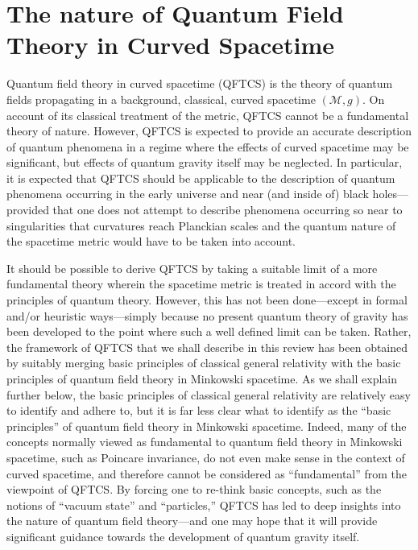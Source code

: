 \documentclass[12pt]{article}
\newcommand{\M}{\mathscr{M}}
\theoremstyle{plain}
\theoremstyle{definition}
\begin{document}

\newpage

\section{The nature of Quantum Field Theory in Curved Spacetime}

Quantum field theory in curved spacetime (QFTCS) is the theory of quantum fields propagating in a background,
classical, curved spacetime $(\M, g)$. On account of its classical treatment of the metric, QFTCS cannot be a fundamental theory of nature. However, QFTCS is expected to provide an accurate description of quantum phenomena in a regime where the effects of curved spacetime may be significant, but effects of quantum gravity itself may be neglected. In particular, it is expected that QFTCS should be applicable to the description of quantum phenomena occurring  in the early universe and near (and inside of) black holes---provided that one does not attempt to describe phenomena occurring so near to singularities that curvatures reach Planckian scales and the quantum nature of the spacetime metric would have to be taken into account.

It should be possible to derive QFTCS by taking a suitable limit of a more fundamental theory wherein the spacetime metric is treated in accord with the principles of quantum theory. However, this has not been done---except in formal and/or heuristic ways---simply because no present quantum theory of gravity has been developed to the point where such a well defined limit can be taken. Rather, the framework of QFTCS that we shall describe in this review has been obtained by suitably merging basic principles of classical general relativity with the basic principles of quantum field theory in Minkowski spacetime. As we shall explain further below, the basic principles of classical general relativity are relatively easy to identify and adhere to, but it is far less clear what to identify as the ``basic principles'' of quantum field theory in Minkowski spacetime. Indeed, many of the concepts normally viewed as fundamental to quantum field theory in Minkowski spacetime, such as Poincare invariance, do not even make sense in the context of curved spacetime, and therefore cannot be considered as ``fundamental'' from the viewpoint of QFTCS. By forcing one to re-think basic concepts, such as the notions of ``vacuum state'' and ``particles,'' QFTCS has led to deep insights into the nature of quantum field theory---and one may hope that it will provide significant guidance towards the development of quantum gravity itself.
\end{document}
